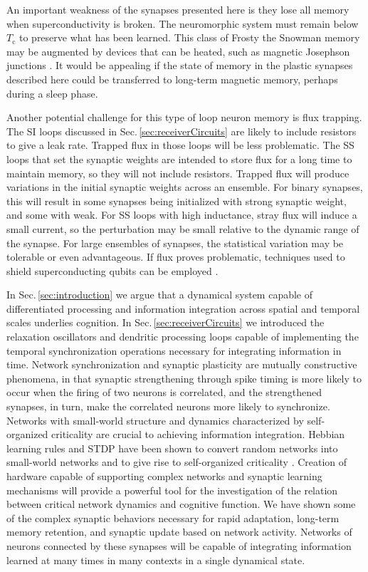 \documentclass[aip,amsmath,amssymb,reprint,nofootinbib]{revtex4-1}
\begin{document}
An important weakness of the synapses presented here is they lose all memory when superconductivity is broken. The neuromorphic system must remain below $T_{\mathrm{c}}$ to preserve what has been learned. This class of Frosty the Snowman memory may be augmented by devices that can be heated, such as magnetic Josephson junctions \cite{ru2016,scdo2017,scdo2018}. It would be appealing if the state of memory in the plastic synapses described here could be transferred to long-term magnetic memory, perhaps during a sleep phase.

Another potential challenge for this type of loop neuron memory is flux trapping. The SI loops discussed in Sec.\,\ref{sec:receiverCircuits} are likely to include resistors to give a leak rate. Trapped flux in those loops will be less problematic. The SS loops that set the synaptic weights are intended to store flux for a long time to maintain memory, so they will not include resistors. Trapped flux will produce variations in the initial synaptic weights across an ensemble. For binary synapses, this will result in some synapses being initialized with strong synaptic weight, and some with weak. For SS loops with high inductance, stray flux will induce a small current, so the perturbation may be small relative to the dynamic range of the synapse. For large ensembles of synapses, the statistical variation may be tolerable or even advantageous. If flux proves problematic, techniques used to shield superconducting qubits can be employed \cite{coch2011}.

In Sec.\,\ref{sec:introduction} we argue that a dynamical system capable of differentiated processing and information integration across spatial and temporal scales underlies cognition. In Sec.\,\ref{sec:receiverCircuits} we introduced the relaxation oscillators and dendritic processing loops capable of implementing the temporal synchronization operations necessary for integrating information in time. Network synchronization and synaptic plasticity are mutually constructive phenomena, in that synaptic strengthening through spike timing is more likely to occur when the firing of two neurons is correlated, and the strengthened synapses, in turn, make the correlated neurons more likely to synchronize. Networks with small-world structure \cite{wast1998,sp2010} and dynamics characterized by self-organized criticality are crucial to achieving information integration. Hebbian learning rules and STDP have been shown to convert random networks into small-world networks and to give rise to self-organized criticality \cite{siqu2007,rusp2011}. Creation of hardware capable of supporting complex networks and synaptic learning mechanisms will provide a powerful tool for the investigation of the relation between critical network dynamics and cognitive function. We have shown some of the complex synaptic behaviors necessary for rapid adaptation, long-term memory retention, and synaptic update based on network activity. Networks of neurons connected by these synapses will be capable of integrating information learned at many times in many contexts in a single dynamical state.
\end{document}
